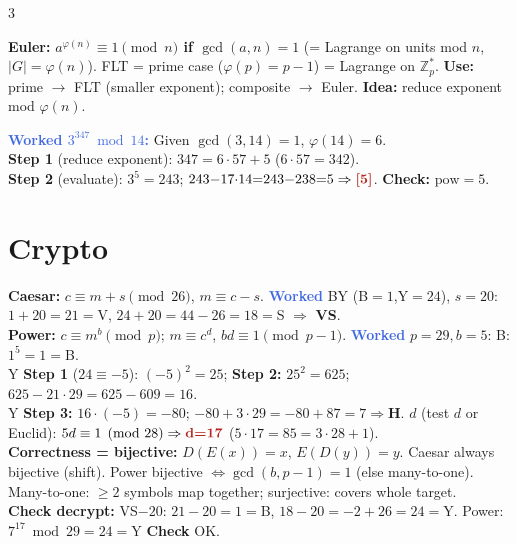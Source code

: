 \documentclass[9pt]{extarticle}
\newcommand{\hl}[1]{\textbf{\textcolor{BrickRed}{#1}}}
\newcommand{\wk}[1]{\textbf{\textcolor{OliveGreen}{#1}}}
\newcommand{\ex}[1]{\textbf{\textcolor{RoyalBlue}{#1}}}
\begin{document}
\begin{multicols}{3}
\begin{kbox}
\textbf{Euler:} \hl{$a^{\varphi(n)}\equiv1\pmod n$ if $\gcd(a,n){=}1$} (= Lagrange on units mod $n$, $|G|{=}\varphi(n)$). FLT = prime case ($\varphi(p){=}p{-}1$) = Lagrange on $\mathbb Z_p^*$. \hl{Use:} prime $\to$ FLT (smaller exponent); composite $\to$ Euler. \hl{Idea:} reduce exponent mod $\varphi(n)$.
\end{kbox}
\begin{sloppypar}\raggedright
\ex{Worked $3^{347}\bmod14$:} Given $\gcd(3,14){=}1$, $\varphi(14){=}6$.\\
\wk{Step 1} (reduce exponent): $347{=}6{\cdot}57{+}5$ ($6{\cdot}57{=}342$).\\
\wk{Step 2} (evaluate): $3^5{=}243$; $243{-}17{\cdot}14{=}243{-}238{=}5\Rightarrow\hl{[5]}$. \wk{Check:} $\mathrm{pow}{=}5$.
\end{sloppypar}

\section{Crypto}
\begin{sloppypar}\raggedright
\textbf{Caesar:} $c\equiv m{+}s\pmod{26}$, $m\equiv c{-}s$. \ex{Worked} BY (B${=}1$,Y${=}24$), $s{=}20$: $1{+}20{=}21{=}$V, $24{+}20{=}44{-}26{=}18{=}$S $\Rightarrow$ \hl{VS}.\\
\textbf{Power:} $c\equiv m^b\pmod p$; $m\equiv c^d$, $bd\equiv1\pmod{p-1}$. \ex{Worked} $p{=}29,b{=}5$: B: $1^5{=}1{=}$B.\\
Y \wk{Step 1} ($24\equiv{-}5$): $({-}5)^2{=}25$; \wk{Step 2:} $25^2{=}625$; $625{-}21{\cdot}29{=}625{-}609{=}16$.\\
Y \wk{Step 3:} $16{\cdot}({-}5){=}{-}80$; ${-}80{+}3{\cdot}29{=}{-}80{+}87{=}7\Rightarrow$\hl{H}. $d$ (test $d$ or Euclid): $5d\equiv1\pmod{28}\Rightarrow \hl{d{=}17}$ ($5{\cdot}17{=}85{=}3{\cdot}28{+}1$).\\
\hl{Correctness = bijective:} $D(E(x)){=}x$, $E(D(y)){=}y$. Caesar always bijective (shift). Power bijective $\iff\gcd(b,p{-}1){=}1$ (else many-to-one). Many-to-one: $\ge2$ symbols map together; surjective: covers whole target.\\
\wk{Check decrypt:} VS${-}20$: $21{-}20{=}1{=}$B, $18{-}20{=}{-}2{+}26{=}24{=}$Y. Power: $7^{17}\bmod29{=}24{=}$Y \wk{Check} OK.
\end{sloppypar}


\end{multicols}
\end{document}
